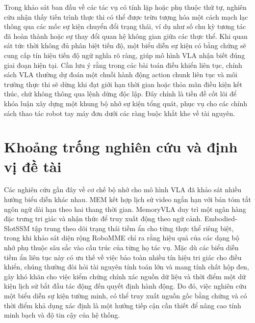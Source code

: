 Trong khảo sát ban đầu về các tác vụ có tính lặp hoặc phụ thuộc thứ tự, nghiên cứu nhận thấy tiến trình thực thi có thể được trừu tượng hóa một cách mạch lạc thông qua các mốc sự kiện chuyển đổi trạng thái, ví dụ như số chu kỳ tương tác đã hoàn thành hoặc sự thay đổi quan hệ không gian giữa các thực thể. Khi quan sát tức thời không đủ phân biệt tiến độ, một biểu diễn sự kiện có bằng chứng sẽ cung cấp tín hiệu tiến độ ngữ nghĩa rõ ràng, giúp mô hình VLA nhận biết đúng giai đoạn hiện tại. Cần lưu ý rằng trong các bài toán điều khiển liên tục, chính sách VLA thường dự đoán một chuỗi hành động action chunk liên tục và môi trường thực thi sẽ dừng khi đạt giới hạn thời gian hoặc thỏa mãn điều kiện kết thúc, chứ không thông qua lệnh dừng độc lập. Đây chính là tiền đề cốt lõi để khóa luận xây dựng một khung bộ nhớ sự kiện tổng quát, phục vụ cho các chính sách thao tác robot tay máy đơn dưới các ràng buộc khắt khe về tài nguyên.

\section{Khoảng trống nghiên cứu và định vị đề tài}

Các nghiên cứu gần đây về cơ chế bộ nhớ cho mô hình VLA đã khảo sát nhiều hướng biểu diễn khác nhau. MEM \cite{mem2026} kết hợp lịch sử video ngắn hạn với bản tóm tắt ngôn ngữ dài hạn theo hai thang thời gian. MemoryVLA \cite{memoryvla2026} duy trì một ngân hàng đặc trưng tri giác và nhận thức để truy xuất động theo ngữ cảnh. Embodied-SlotSSM \cite{liberomem2025} tập trung theo dõi trạng thái tiềm ẩn cho từng thực thể riêng biệt, trong khi khảo sát diện rộng RoboMME \cite{robomme2026} chỉ ra rằng hiệu quả của các dạng bộ nhớ phụ thuộc sâu sắc vào cấu trúc của từng họ tác vụ. Mặc dù các biểu diễn tiềm ẩn liên tục này có ưu thế về việc bảo toàn nhiều tín hiệu tri giác cho điều khiển, chúng thường đòi hỏi tài nguyên tính toán lớn và mang tính chất hộp đen, gây khó khăn cho việc kiểm chứng chính xác nguồn dữ liệu và thời điểm một dữ kiện lịch sử bắt đầu tác động đến quyết định hành động. Do đó, việc nghiên cứu một biểu diễn sự kiện tường minh, có thể truy xuất nguồn gốc bằng chứng và có thời điểm khả dụng xác định là một hướng tiếp cận cần thiết để nâng cao tính minh bạch và độ tin cậy của hệ thống.

